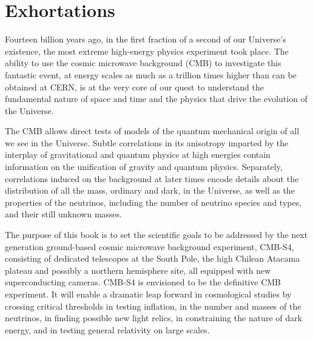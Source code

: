  
\chapter{Exhortations}
\label{chap:intro}





\bigskip

Fourteen billion years ago, in the first fraction of a second of our Universe's existence, the most extreme high-energy physics experiment took place. The ability to use the cosmic microwave background (CMB) to investigate this fantastic event, at energy scales as much as a trillion times higher than can be obtained at CERN, is at the very core of our quest to understand the fundamental nature of space and time and the physics that drive the evolution of the Universe. 

The CMB allows direct tests of models of the quantum mechanical origin of all we see in the Universe. Subtle correlations in its anisotropy imparted by the interplay of gravitational and quantum physics at high energies contain information on the unification of gravity and quantum physics. Separately, correlations induced on the background at later times encode details about the distribution of all the mass, ordinary and dark, in the Universe, as well as the properties of the neutrinos, including the number of neutrino species and types, and their still unknown masses. 

The purpose of this book is to set the scientific goals to be addressed by the next generation ground-based cosmic microwave background experiment, CMB-S4, consisting of dedicated telescopes at the South Pole, the high Chilean Atacama plateau and possibly a northern hemisphere site, all equipped with new superconducting cameras. CMB-S4 
is envisioned to be the definitive CMB experiment. It will enable a dramatic leap forward in cosmological studies by crossing critical thresholds in testing inflation, in the number and masses of the neutrinos, in finding possible new light relics, in  constraining the nature of dark energy, and in testing general relativity on large scales. 


